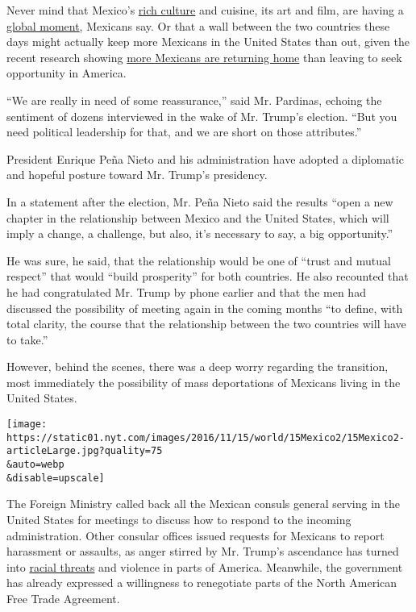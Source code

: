 Never mind that Mexico's
\href{http://www.nytimes.com/2016/08/24/world/americas/mexico-culture-art-fashion.html?_r=0}{rich
culture} and cuisine, its art and film, are having a
\href{http://www.nytimes.com/interactive/2016/01/07/travel/places-to-visit.html?_r=0}{global
moment}, Mexicans say. Or that a wall between the two countries these
days might actually keep more Mexicans in the United States than out,
given the recent research showing
\href{http://www.nytimes.com/2015/11/20/us/more-mexican-immigrants-leaving-us-than-entering-report-finds.html}{more
Mexicans are returning home} than leaving to seek opportunity in
America.

``We are really in need of some reassurance,'' said Mr. Pardinas,
echoing the sentiment of dozens interviewed in the wake of Mr. Trump's
election. ``But you need political leadership for that, and we are short
on those attributes.''

President Enrique Peña Nieto and his administration have adopted a
diplomatic and hopeful posture toward Mr. Trump's presidency.

In a statement after the election, Mr. Peña Nieto said the results
``open a new chapter in the relationship between Mexico and the United
States, which will imply a change, a challenge, but also, it's necessary
to say, a big opportunity.''

He was sure, he said, that the relationship would be one of ``trust and
mutual respect'' that would ``build prosperity'' for both countries. He
also recounted that he had congratulated Mr. Trump by phone earlier and
that the men had discussed the possibility of meeting again in the
coming months ``to define, with total clarity, the course that the
relationship between the two countries will have to take.''

However, behind the scenes, there was a deep worry regarding the
transition, most immediately the possibility of mass deportations of
Mexicans living in the United States.

\texttt{[image: https://static01.nyt.com/images/2016/11/15/world/15Mexico2/15Mexico2-articleLarge.jpg?quality=75\\\&auto=webp\\\&disable=upscale]}

The Foreign Ministry called back all the Mexican consuls general serving
in the United States for meetings to discuss how to respond to the
incoming administration. Other consular offices issued requests for
Mexicans to report harassment or assaults, as anger stirred by Mr.
Trump's ascendance has turned into
\href{http://www.nytimes.com/2016/11/12/us/reports-of-bias-based-attacks-tick-upward-after-election.html}{racial
threats} and violence in parts of America. Meanwhile, the government has
already expressed a willingness to renegotiate parts of the North
American Free Trade Agreement.

